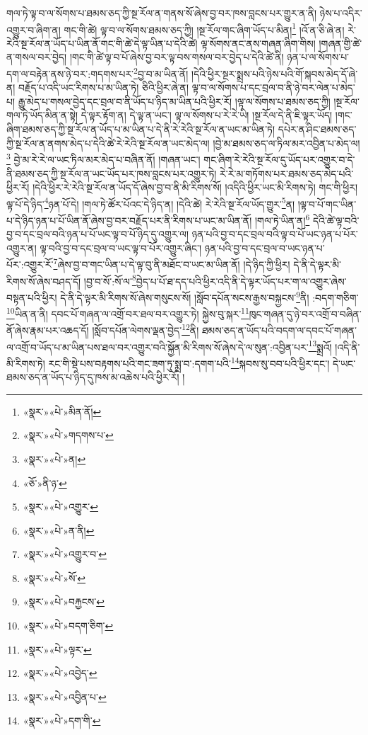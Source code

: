གལ་ཏེ་ལྟ་བ་ལ་སོགས་པ་ཐམས་ཅད་ཀྱི་སྔ་རོལ་ན་གནས་སོ་ཞེས་བྱ་བར་ཁས་བླངས་པར་གྱུར་ན་ནི། ཉེས་པ་འདིར་འགྱུར་བ་ཞིག་ན། གང་གི་ཚེ། ལྟ་བ་ལ་སོགས་ཐམས་ཅད་ཀྱི། །སྔ་རོལ་གང་ཞིག་ཡོད་པ་མིན།\footnote{«སྣར་»«པེ་»མིན་ནོ།} །འོ་ན་ཅི་ཞེ་ན། རེ་རེའི་སྔ་རོལ་ན་ཡོད་པ་ཡིན་ནོ་གང་གི་ཚེ་དེ་ལྟ་ཡིན་པ་དེའི་ཚེ། ལྟ་སོགས་ནང་ནས་གཞན་ཞིག་གིས། །གཞན་གྱི་ཚེ་ན་གསལ་བར་བྱེད། །གང་གི་ཚེ་ལྟ་བ་པོ་ཞེས་བྱ་བར་ལྟ་བས་གསལ་བར་བྱེད་པ་དེའི་ཚེ་ནི། ཉན་པ་ལ་སོགས་པ་དག་ལ་བརྟེན་ནས་ཉེ་བར་:གདགས་པར་\footnote{«སྣར་»«པེ་»གདགས་པ་}བྱ་བ་མ་ཡིན་ནོ། །དེའི་ཕྱིར་སྔར་སྨྲས་པའི་ཉེས་པའི་གོ་སྐབས་མེད་དོ་ཞེ་ན། བརྗོད་པ་འདི་ཡང་རིགས་པ་མ་ཡིན་ཏེ། ཅིའི་ཕྱིར་ཞེ་ན། ལྟ་བ་ལ་སོགས་པ་དང་བྲལ་བ་ནི་ཉེ་བར་ལེན་པ་མེད་པ། རྒྱུ་མེད་པ་གསལ་བྱེད་དང་བྲལ་བ་ནི་ཡོད་པ་ཉིད་མ་ཡིན་པའི་ཕྱིར་རོ། །ལྟ་ལ་སོགས་པ་ཐམས་ཅད་ཀྱི། །སྔ་རོལ་གལ་ཏེ་ཡོད་མིན་ན་སྟེ། དེ་ལྟར་རྟོག་ན། དེ་ལྟ་ན་ཡང་། ལྟ་ལ་སོགས་པ་རེ་རེ་ཡི། །སྔ་རོལ་དེ་ནི་ཇི་ལྟར་ཡོད། །གང་ཞིག་ཐམས་ཅད་ཀྱི་སྔ་རོལ་ན་ཡོད་པ་མ་ཡིན་པ་དེ་ནི་རེ་རེའི་སྔ་རོལ་ན་ཡང་མ་ཡིན་ཏེ། དཔེར་ན་ཤིང་ཐམས་ཅད་ཀྱི་སྔ་རོལ་ན་ནགས་མེད་པ་དེའི་ཚེ་རེ་རེའི་སྔ་རོལ་ན་ཡང་མེད་ལ། །བྱེ་མ་ཐམས་ཅད་ལ་ཏིལ་མར་འབྱིན་པ་མེད་ལ།\footnote{«སྣར་»«པེ་»ན།} བྱེ་མ་རེ་རེ་ལ་ཡང་ཏིལ་མར་མེད་པ་བཞིན་ནོ། །གཞན་ཡང་། གང་ཞིག་རེ་རེའི་སྔ་རོལ་དུ་ཡོད་པར་འགྱུར་བ་དེ་ནི་ཐམས་ཅད་ཀྱི་སྔ་རོལ་ན་ཡང་ཡོད་པར་ཁས་བླངས་པར་འགྱུར་ཏེ། རེ་རེ་མ་གཏོགས་པར་ཐམས་ཅད་མེད་པའི་ཕྱིར་རོ། །དེའི་ཕྱིར་རེ་རེའི་སྔ་རོལ་ན་ཡོད་དོ་ཞེས་བྱ་བ་ནི་མི་རིགས་སོ། །འདིའི་ཕྱིར་ཡང་མི་རིགས་ཏེ། གང་གི་ཕྱིར། ལྟ་པོ་དེ་ཉིད་\footnote{«ཅོ་»ནི་ཉ་}ཉན་པོ་དེ། །གལ་ཏེ་ཚོར་པོའང་དེ་ཉིད་ན། །དེའི་ཚེ། རེ་རེའི་སྔ་རོལ་ཡོད་གྱུར་\footnote{«སྣར་»«པེ་»འགྱུར་}ན། །ལྟ་བ་པོ་གང་ཡིན་པ་དེ་ཉིད་ཉན་པ་པོ་ཡིན་ནོ་ཞེས་བྱ་བར་བརྗོད་པར་ནི་རིགས་པ་ཡང་མ་ཡིན་ནོ། །གལ་ཏེ་ཡིན་ན།\footnote{«སྣར་»«པེ་»ན་ནི།} དེའི་ཚེ་ལྟ་བའི་བྱ་བ་དང་བྲལ་བའི་ཉན་པ་པོ་ཡང་ལྟ་བ་པོ་ཉིད་དུ་འགྱུར་ལ། ཉན་པའི་བྱ་བ་དང་བྲལ་བའི་ལྟ་བ་པོ་ཡང་ཉན་པ་པོར་འགྱུར་ན། ལྟ་བའི་བྱ་བ་དང་བྲལ་བ་ཡང་ལྟ་བ་པོར་འགྱུར་ཞིང་། ཉན་པའི་བྱ་བ་དང་བྲལ་བ་ཡང་ཉན་པ་པོར་:འགྱུར་རོ་\footnote{«སྣར་»«པེ་»འགྱུར་བ་}ཞེས་བྱ་བ་གང་ཡིན་པ་དེ་ལྟ་བུ་ནི་མཐོང་བ་ཡང་མ་ཡིན་ནོ། །དེ་ཉིད་ཀྱི་ཕྱིར། དེ་ནི་དེ་ལྟར་མི་རིགས་སོ་ཞེས་བཤད་དོ། །བྱ་བ་སོ་:སོ་ལ་\footnote{«སྣར་»«པེ་»སོ་}བྱེད་པ་པོ་ཐ་དད་པའི་ཕྱིར་འདི་ནི་དེ་ལྟར་ཡོད་པར་ག་ལ་འགྱུར་ཞེས་བསྟན་པའི་ཕྱིར། དེ་ནི་དེ་ལྟར་མི་རིགས་སོ་ཞེས་གསུངས་སོ། །སློབ་དཔོན་སངས་རྒྱས་བསྐྱངས་\footnote{«སྣར་»«པེ་»བརྐྱངས་}ནི། :བདག་གཅིག་\footnote{«སྣར་»«པེ་»བདག་ཅིག་}ཡིན་ན་ནི། དབང་པོ་གཞན་ལ་འགྲོ་བར་ཐལ་བར་འགྱུར་ཏེ། སྐྱེས་བུ་སྐར་\footnote{«སྣར་»«པེ་»ལྟར་}ཁུང་གཞན་དུ་ཉེ་བར་འགྲོ་བ་བཞིན་ནོ་ཞེས་རྣམ་པར་འཆད་དོ། །སློབ་དཔོན་ལེགས་ལྡན་བྱེད་\footnote{«སྣར་»«པེ་»འབྱེད་}ནི། ཐམས་ཅད་ན་ཡོད་པའི་བདག་ལ་དབང་པོ་གཞན་ལ་འགྲོ་བ་ཡོད་པ་མ་ཡིན་པས་ཐལ་བར་འགྱུར་བའི་སྐྱོན་མི་རིགས་སོ་ཞེས་དེ་ལ་སུན་:འབྱིན་པར་\footnote{«སྣར་»«པེ་»འབྱིན་པ་}སྨྲའོ། །འདི་ནི་མི་རིགས་ཏེ། རང་གི་སྡེ་པས་བརྟགས་པའི་གང་ཟག་ཏུ་སྨྲ་བ་:དགག་པའི་\footnote{«སྣར་»«པེ་»དག་གི་}སྐབས་སུ་བབ་པའི་ཕྱིར་དང་། དེ་ཡང་ཐམས་ཅད་ན་ཡོད་པ་ཉིད་དུ་ཁས་མ་འཆེས་པའི་ཕྱིར་རོ། །
